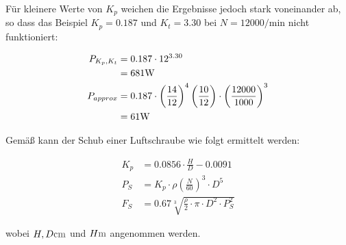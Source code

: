 Für kleinere Werte von $K_p$ weichen die Ergebnisse jedoch stark voneinander ab, so dass das Beispiel $K_p = 0.187$ und $K_t = 3.30$ bei $N = 12000 \si{\per\minute}$  nicht funktioniert:

\begin{align}
	P_{K_p,K_t} &= 0.187 \cdot 12^{3.30} \\ &= 681 \si{\watt} \notag\\
	P_{approx} &= 0.187 \cdot \left(\frac{14}{12}\right)^4 \left(\frac{10}{12}\right) \cdot \left(\frac{12000}{1000}\right)^3 \\ &= 61 \si{\watt} \notag
\end{align}

\bigbreak

Gemäß \cite{standschub} kann der Schub einer Luftschraube wie folgt ermittelt werden:

\begin{align}
	K_p &= 0.0856 \cdot \frac{H}{D} - 0.0091 \\
	P_S &= K_p \cdot \rho \left(\frac{N}{60}\right)^3 \cdot D^5 \\
	F_S &= 0.67 \sqrt[3]{\frac{\rho}{2}\cdot\pi \cdot D^2 \cdot P_S^2}
\end{align}

wobei $H,D \withunit{\centi\meter}$ und $H \withunit{\meter}$ angenommen werden.

